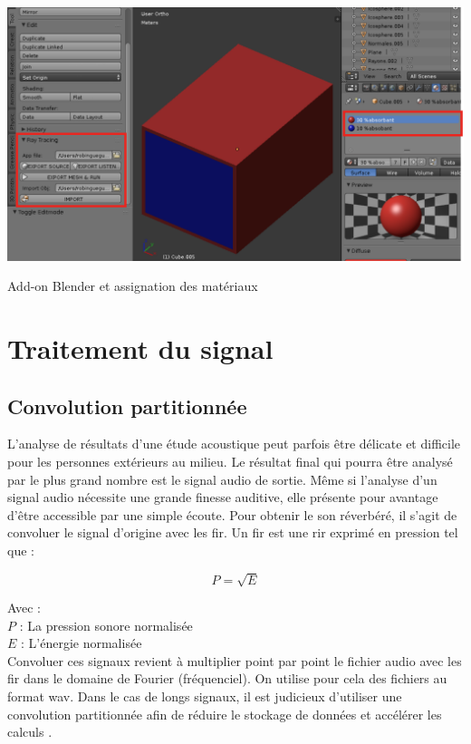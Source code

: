 \begin{figureth}
	\includegraphics[width=\linewidth]{images/add-on}
	\caption{Add-on Blender et assignation des matériaux}
\end{figureth}

\chapter{Traitement du signal}
	\minitoc
	\newpage
	
\section{Convolution partitionnée} \label{sect_TDS}

L'analyse de résultats d'une étude acoustique peut parfois être délicate et difficile pour les personnes extérieurs au milieu. Le résultat final qui pourra être analysé par le plus grand nombre est le signal audio de sortie. Même si l'analyse d'un signal audio nécessite une grande finesse auditive, elle présente pour avantage d'être accessible par une simple écoute. Pour obtenir le son réverbéré, il s'agit de convoluer le signal d'origine avec les \gls{fir}. Un \gls{fir} est une \gls{rir} exprimé en pression tel que :

\begin{equation}
P = \sqrt{E}
\end{equation}

Avec : \\
$P$ : La pression sonore normalisée \\
$E$ : L'énergie normalisée \\

Convoluer ces signaux revient à multiplier point par point le fichier audio avec les \gls{fir} dans le domaine de Fourier (fréquenciel).
On utilise pour cela des fichiers au format \gls{wav}. Dans le cas de longs signaux, il est judicieux d'utiliser une convolution partitionnée afin de réduire le stockage de données et accélérer les calculs \cite[2. Algorithm overview ]{partition}. 


